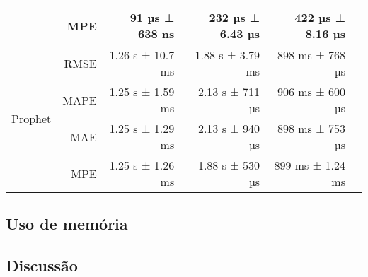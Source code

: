 \begin{table}[!htp]
\begin{tabular}{lrrrrr}
                                 & MPE                      & 91 µs ± 638 ns              & 232 µs ± 6.43 µs & 422 µs ± 8.16 µs  \\ \midrule
        \multirow{4}{*}{Prophet} & RMSE                     & 1.26 s ± 10.7 ms            & 1.88 s ± 3.79 ms & 898 ms ± 768 µs   \\
                                 & MAPE                     & 1.25 s ± 1.59 ms            & 2.13 s ± 711 µs  & 906 ms ± 600 µs   \\
                                 & MAE                      & 1.25 s ± 1.29 ms            & 2.13 s ± 940 µs  & 898 ms ± 753 µs   \\
                                 & MPE                      & 1.25 s ± 1.26 ms            & 1.88 s ± 530 µs  & 899 ms ± 1.24 ms  \\ \midrule
    \end{tabular}
\end{table}

\subsection{Uso de memória}

\subsection{Discussão}
